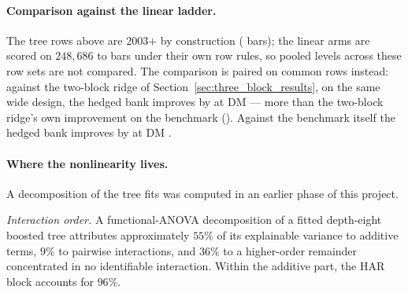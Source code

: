 \paragraph{Comparison against the linear ladder.} The tree
rows above are $2003$+ by construction (\unifTreeHedgeN{} bars); the linear
arms are scored
on $248{,}686$ to \unifAzeroN{} bars under their own row rules, so pooled
levels across these row sets are not compared. The comparison is paired
on common rows instead: against the two-block ridge of
Section~\ref{sec:three_block_results}, on the same wide design, the
hedged bank improves by \unifTreeBankHedgeVsBlkTwoDQ{} at DM
\unifTreeBankHedgeVsBlkTwoDM{} --- more than the two-block ridge's own
improvement on the benchmark (\unifBlkTwoUserDelta{}). Against the
benchmark itself the hedged bank improves by \unifTreeHedgeDelta{} at DM
\unifTreeHedgeDM{}.


\paragraph{Where the nonlinearity lives.} A decomposition of the tree
fits was computed in an earlier phase of this project.

\emph{Interaction order.} A functional-ANOVA decomposition of a fitted
depth-eight boosted tree attributes approximately $55\%$ of its explainable
variance to additive terms, $9\%$ to pairwise interactions, and $36\%$ to a
higher-order remainder concentrated in no identifiable interaction. Within
the additive part, the HAR block accounts for $96\%$.

